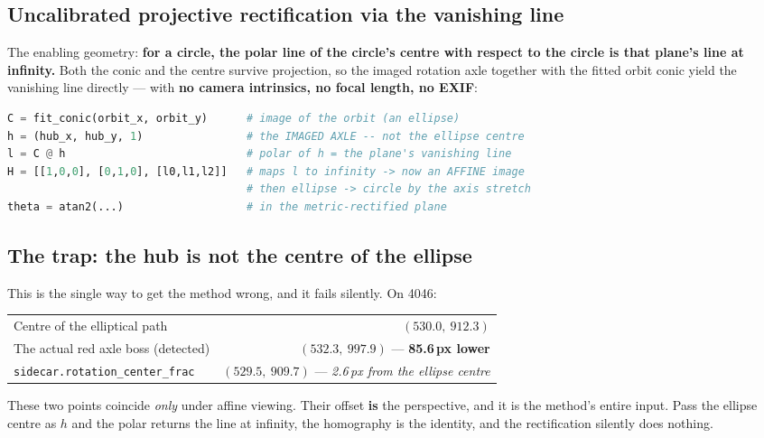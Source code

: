 \documentclass[11pt,a4paper]{article}
\begin{document}
\subsection{Uncalibrated projective rectification via the vanishing line}

The enabling geometry: \textbf{for a circle, the polar line of the circle's centre with respect
to the circle is that plane's line at infinity.} Both the conic and the centre survive
projection, so the imaged rotation axle together with the fitted orbit conic yield the vanishing
line directly --- with \textbf{no camera intrinsics, no focal length, no EXIF}:

\begin{lstlisting}[language=Python]
C = fit_conic(orbit_x, orbit_y)      # image of the orbit (an ellipse)
h = (hub_x, hub_y, 1)                # the IMAGED AXLE -- not the ellipse centre
l = C @ h                            # polar of h = the plane's vanishing line
H = [[1,0,0], [0,1,0], [l0,l1,l2]]   # maps l to infinity -> now an AFFINE image
                                     # then ellipse -> circle by the axis stretch
theta = atan2(...)                   # in the metric-rectified plane
\end{lstlisting}

\subsection{The trap: the hub is not the centre of the ellipse}
\label{sec:trap}

This is the single way to get the method wrong, and it fails silently. On 4046:

\begin{center}
\begin{tabular}{lr}
\toprule
Centre of the elliptical path & $(530.0,\ 912.3)$ \\
The actual red axle boss (detected) & $(532.3,\ 997.9)$ --- \textbf{85.6\,px lower} \\
\texttt{sidecar.rotation\_center\_frac} & $(529.5,\ 909.7)$ --- \emph{2.6\,px from the ellipse centre} \\
\bottomrule
\end{tabular}
\end{center}

These two points coincide \emph{only} under affine viewing. Their offset \textbf{is} the
perspective, and it is the method's entire input. Pass the ellipse centre as $h$ and the polar
returns the line at infinity, the homography is the identity, and the rectification silently
does nothing.
\end{document}
